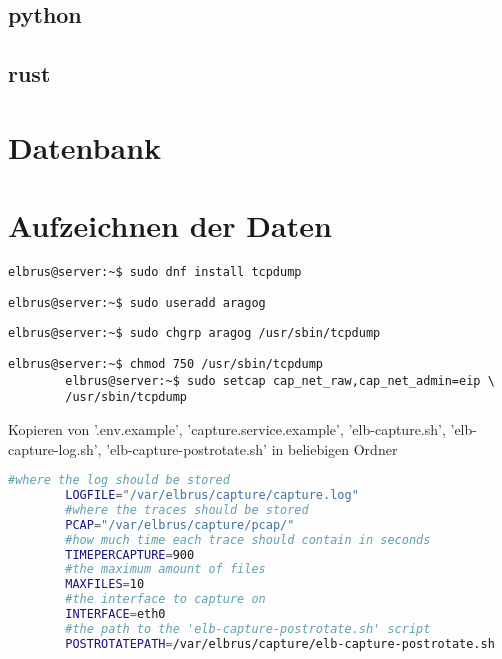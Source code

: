 \documentclass{article}
\begin{document}
	\subsection{python}
	\subsection{rust}
	\newpage

	\section{Datenbank}
	\newpage
	
	\section{Aufzeichnen der Daten}
	\lstset{style=commands}
	\begin{lstlisting}[caption={Installieren von 'tcpdump' für das aufzeichnen von Daten.}]
		elbrus@server:~$ sudo dnf install tcpdump
	\end{lstlisting}

	\begin{lstlisting}[caption={Anlegen eines Users der Berechtigungen zum ausführen von 'tcpdump' erhält.}]
		elbrus@server:~$ sudo useradd aragog
	\end{lstlisting}
	
	\begin{lstlisting}[caption={Zuweisen von 'tcpdump' zu der Gruppe 'aragog'.}]
		elbrus@server:~$ sudo chgrp aragog /usr/sbin/tcpdump
	\end{lstlisting}
	
	\begin{lstlisting}[caption={Ändern der Berechtigungen auf 'tcpdump'.}]
		elbrus@server:~$ chmod 750 /usr/sbin/tcpdump
		elbrus@server:~$ sudo setcap cap_net_raw,cap_net_admin=eip \
		/usr/sbin/tcpdump
	\end{lstlisting}

	Kopieren von '.env.example', 'capture.service.example', 'elb-capture.sh', 'elb-capture-log.sh', 'elb-capture-postrotate.sh' in beliebigen Ordner 

	\lstset{style=files}
	\begin{lstlisting}[caption={Anhand von '.env.example' eigene '.env' Datei anlegen}, language=bash]
		#where the log should be stored
		LOGFILE="/var/elbrus/capture/capture.log"
		#where the traces should be stored
		PCAP="/var/elbrus/capture/pcap/"
		#how much time each trace should contain in seconds
		TIMEPERCAPTURE=900
		#the maximum amount of files
		MAXFILES=10
		#the interface to capture on
		INTERFACE=eth0
		#the path to the 'elb-capture-postrotate.sh' script
		POSTROTATEPATH=/var/elbrus/capture/elb-capture-postrotate.sh
	\end{lstlisting}
\end{document}
